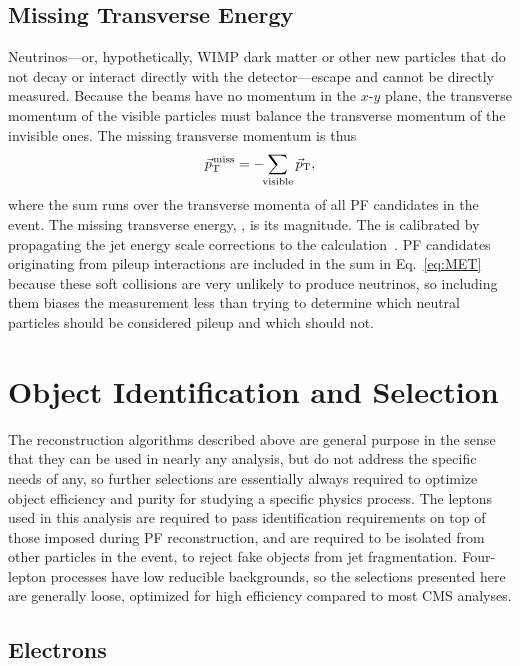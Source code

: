 \subsection{Missing Transverse Energy}

Neutrinos---or, hypothetically, WIMP dark matter or other new particles that do not decay or interact directly with the detector---escape and cannot be directly measured.
Because the beams have no momentum in the $x$-$y$ plane, the transverse momentum of the visible particles must balance the transverse momentum of the invisible ones.
The missing transverse momentum is thus
\begin{equation}\label{eq:MET}
  {\vec p}_{\mathrm{T}}^{\kern1pt\mathrm{miss}} = -\! \! \sum_\text{visible} {\vec p}_{\mathrm{T}},
\end{equation}
where the sum runs over the transverse momenta of all PF candidates in the event.
The missing transverse energy, {\MET}, is its magnitude.
The {\MET} is calibrated by propagating the jet energy scale corrections to the {\MET} calculation~\cite{Chatrchyan:2011tn,Khachatryan:2014gga,CMS-PAS-JME-16-004}.
PF candidates originating from pileup interactions are included in the sum in Eq.~\ref{eq:MET} because these soft collisions are very unlikely to produce neutrinos, so including them biases the measurement less than trying to determine which neutral particles should be considered pileup and which should not.



\section{Object Identification and Selection}

The reconstruction algorithms described above are general purpose in the sense that they can be used in nearly any analysis, but do not address the specific needs of any, so further selections are essentially always required to optimize object efficiency and purity for studying a specific physics process.
The leptons used in this analysis are required to pass identification requirements on top of those imposed during PF reconstruction, and are required to be isolated from other particles in the event, to reject fake objects from jet fragmentation.
Four-lepton processes have low reducible backgrounds, so the selections presented here are generally loose, optimized for high efficiency compared to most CMS analyses.


\subsection{Electrons}

